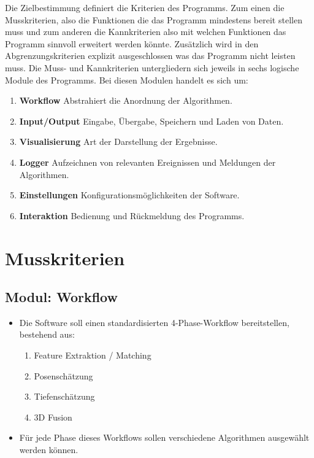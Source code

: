 Die Zielbestimmung definiert die Kriterien des Programms. Zum einen die Musskriterien, also die Funktionen die das Programm mindestens bereit stellen muss und zum anderen die Kannkriterien also mit welchen Funktionen das Programm sinnvoll erweitert werden könnte. Zusätzlich wird in den Abgrenzungskriterien explizit ausgeschlossen was das Programm nicht leisten muss. Die Muss- und Kannkriterien untergliedern sich jeweils in sechs logische Module des Programms. Bei diesen Modulen handelt es sich um:
\begin{enumerate}
	\item \textbf{Workflow} Abstrahiert die Anordnung der Algorithmen.
	\item \textbf{Input/Output} Eingabe, Übergabe, Speichern und Laden von Daten.
	\item \textbf{Visualisierung} Art der Darstellung der Ergebnisse.
	\item \textbf{Logger} Aufzeichnen von relevanten Ereignissen und Meldungen der Algorithmen.
	\item \textbf{Einstellungen} Konfigurationsmöglichkeiten der Software.
	\item \textbf{Interaktion} Bedienung und Rückmeldung des Programms.
\end{enumerate}

\section{Musskriterien}
\subsection{Modul: Workflow}
\begin{itemize}
	\item Die Software soll einen standardisierten 4-Phase-Workflow bereitstellen, bestehend aus:
	\begin{enumerate}
		\item Feature Extraktion / Matching
		\item Posenschätzung
		\item Tiefenschätzung
		\item 3D Fusion
	\end{enumerate}
	\item Für jede Phase dieses Workflows sollen verschiedene Algorithmen ausgewählt werden können.
\end{itemize}

